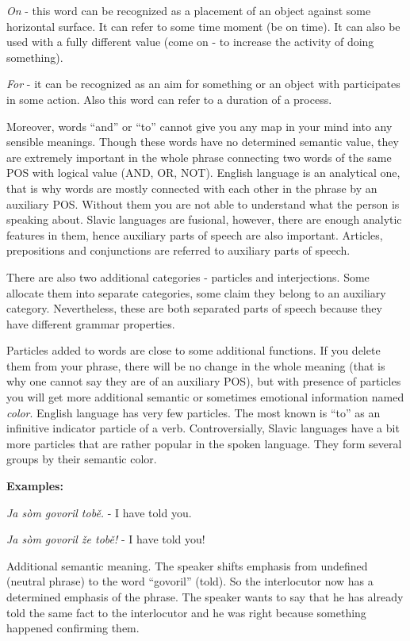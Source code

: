 \textit{On} - this word can be recognized as a placement of an object against some horizontal surface. It can refer to some time moment (be on time). It can also be used with a fully different value (come on - to increase the activity of doing something).

\textit{For} - it can be recognized as an aim for something or an object with participates in some action. Also this word can refer to a duration of a process.

Moreover, words “and” or “to” cannot give you any map in your mind into any sensible meanings. Though these words have no determined semantic value, they are extremely important in the whole phrase connecting two words of the same POS with logical value (AND, OR, NOT). English language is an analytical one, that is why words are mostly connected with each other in the phrase by an auxiliary POS. Without them you are not able to understand what the person is speaking about. Slavic languages are fusional, however, there are enough analytic features in them, hence auxiliary parts of speech are also important. Articles, prepositions and conjunctions are referred to auxiliary parts of speech.

There are also two additional categories - particles and interjections. Some allocate them into separate categories, some claim they belong to an auxiliary category. Nevertheless, these are both separated parts of speech because they have different grammar properties.

Particles added to words are close to some additional functions. If you delete them from your phrase, there will be no change in the whole meaning (that is why one cannot say they are of an auxiliary POS), but with presence of particles you will get more additional semantic or sometimes emotional information named \textit{color}. English language has very few particles. The most known is “to” as an infinitive indicator particle of a verb. Controversially, Slavic languages have a bit more particles that are rather popular in the spoken language. They form several groups by their semantic color.

\textbf{Examples:}

\textit{Ja sòm govoril tobě.} - I have told you.

\textit{Ja sòm govoril že tobě!} - I have told you!

Additional semantic meaning. The speaker shifts emphasis from undefined (neutral phrase) to the word “govoril” (told). So the interlocutor now has a determined emphasis of the phrase. The speaker wants to say that he has already told the same fact to the interlocutor and he was right because something happened confirming them.

